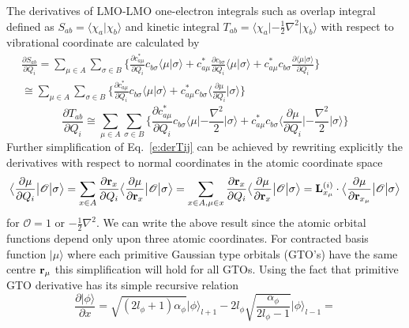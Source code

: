 \documentclass[a4paper,titlepage,twoside,fleqn,12pt]{book}
\newcommand{\ket}[1]{\ensuremath{\bigr\rvert {#1} \bigr\rangle}}
\newcommand{\braket}[2]{\ensuremath{\bigl\langle {#1} \bigl\lvert {#2} \bigr\rangle}}
\newcommand{\tbraket}[3]{\ensuremath{\bigl\langle {#1} \bigl\lvert {#2} \bigl\lvert {#3} \bigr\rangle}}
\newcommand{\fderiv}[2]{\ensuremath{
    \frac{\partial #1}{\partial #2}}}
\begin{document}
\begin{refsection}
The derivatives of LMO-LMO one-electron integrals 
such as overlap integral defined as $S_{ab}=\langle \chi_a\vert\chi_b\rangle$ 
and kinetic integral 
$T_{ab}=\langle \chi_a\lvert-\frac{1}{2}\nabla^2\rvert\chi_b\rangle$
with respect to vibrational coordinate are calculated by
%
\begin{multline}\label{e:derSij}
\fderiv{S_{ab}}{Q_i} = 
\sum_{\mu \in A} \sum_{\sigma \in B} 
\Big\{
\fderiv{c_{a\mu}^*}{Q_i} c_{b\sigma} \braket{\mu}{\sigma} +
c_{a\mu}^* \fderiv{c_{b\sigma}}{Q_i} \braket{\mu}{\sigma} + 
c_{a\mu}^* c_{b\sigma}  \fderiv{\braket{\mu}{\sigma}}{Q_i}
\Big\}
\\ \cong
\sum_{\mu \in A} \sum_{\sigma \in B} 
\Big\{
\fderiv{c_{a\mu}^*}{Q_i} c_{b\sigma} \braket{\mu}{\sigma} +
c_{a\mu}^* c_{b\sigma}   \braket{\fderiv{\mu}{Q_i}}{\sigma}
\Big\}
\quad\quad\quad\quad\quad\quad\quad\quad\quad\quad\quad\quad\quad
\end{multline}
%
\begin{equation}\label{e:derTij}
\fderiv{T_{ab}}{Q_i}  \cong
\sum_{\mu \in A} \sum_{\sigma \in B} 
\Big\{
\fderiv{c_{a\mu}^*}{Q_i} c_{b\sigma} \tbraket{\mu}{ -\frac{\nabla^2}{2} }{\sigma} +
c_{a\mu}^* c_{b\sigma}   \tbraket{\fderiv{\mu}{Q_i}}{ -\frac{\nabla^2}{2} }{\sigma}
\Big\}
\end{equation}
%
Further simplification of Eq.~\eqref{e:derTij} 
can be achieved by rewriting explicitly the derivatives 
with respect to normal coordinates in the atomic coordinate space 
%
\begin{equation}\label{e:derXij}
\tbraket{\fderiv{\mu}{Q_i}}{ \mathscr{O} }{\sigma} = 
\sum_{x \in A} \fderiv{{\bf r}_x}{Q_i} \tbraket{\fderiv{\mu}{{\bf r}_x}}{ \mathscr{O} }{\sigma} =
\sum_{x \in A, \mu \in x} \fderiv{{\bf r}_x}{Q_i} \tbraket{\fderiv{\mu}{{\bf r}_x}}{ \mathscr{O} }{\sigma} =
{\bf L}^{(i)}_{x_\mu} \cdot \tbraket{\fderiv{\mu}{{\bf r}_{x_\mu}}}{ \mathscr{O} }{\sigma}
\end{equation}
%
for $\mathscr{O}=1$ or $-\frac{1}{2}\nabla^2$.
We can write the above result since the atomic orbital functions depend only upon three atomic coordinates. For contracted 
basis function $\ket{\mu}$ where each primitive Gaussian type orbitals (GTO's) have the same centre
${\bf r}_\mu$ this simplification will hold for all GTOs. Using the fact that primitive GTO derivative
has its simple recursive relation
%
\begin{equation}\label{e:orbder}
\fderiv{\ket{\phi}} {x} = 
\sqrt{\left( 2l_\phi + 1 \right)\alpha_\phi} \ket{\phi}_{l+1} -
2l_\phi \sqrt{\frac{\alpha_\phi}{2l_\phi-1}} \ket{\phi}_{l-1} =

\end{equation}
\end{refsection}
\end{document}
